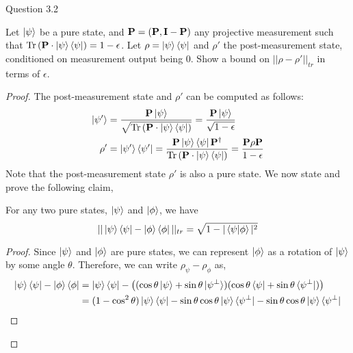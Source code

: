 \begin{solution}{Question 3.2}\label{ques:32}
    \begin{question}
        Let $\ket{\psi}$ be a pure state, and $\mathbf{P} = (\mathbf{P}, \mathbf{I} - \mathbf{P})$ any projective measurement such that $\mathrm{Tr}\left( \mathbf{P}\cdot\ket{\psi}\bra{\psi} \right) = 1 - \epsilon$. Let $\rho = \ket{\psi}\bra{\psi}$ and $\rho'$ the post-measurement state, conditioned on measurement output being $0$. Show a bound on $||\rho - \rho'||_{tr}$ in terms of $\epsilon$.
    \end{question}
    \tcblower{}
    \begin{proof}
        The post-measurement state and $\rho'$ can be computed as follows:
        \begin{equation}
            \begin{split}
                \ket{\psi'} &= \frac{\mathbf{P}\ket{\psi}}{\sqrt{\mathrm{Tr}\left( \mathbf{P}\cdot\ket{\psi}\bra{\psi} \right)}} = \frac{\mathbf{P}\ket{\psi}}{\sqrt{1-\epsilon}}\\
                \rho' &= \ket{\psi'}\bra{\psi'} = \frac{\mathbf{P}\ket{\psi}\bra{\psi}\mathbf{P}^\dagger}{\mathrm{Tr}\left( \mathbf{P}\cdot\ket{\psi}\bra{\psi} \right)} = \frac{\mathbf{P}\rho\mathbf{P}}{1-\epsilon}
            \end{split}
        \end{equation}
        Note that the post-measurement state $\rho'$ is also a pure state. We now state and prove the following claim,
        \begin{claim}
            For any two pure states, $\ket{\psi}$ and $\ket{\phi}$, we have
            \begin{equation}
                ||\ket{\psi}\bra{\psi} - \ket{\phi}\bra{\phi}||_{tr} = \sqrt{1 - |\braket{\psi|\phi}|^2}
            \end{equation}
        \end{claim}
        \begin{proof}
            Since $\ket{\psi}$ and $\ket{\phi}$ are pure states, we can represent $\ket{\phi}$ as a rotation of $\ket{\psi}$ by some angle $\theta$. Therefore, we can write $\rho_{\psi} - \rho_{\phi}$ as,
            \begin{equation}
                \begin{split}
                    \ketbra{\psi} - \ketbra{\phi} &= \ketbra{\psi} - \left((\cos\theta\ket{\psi} + \sin\theta\ket{\psi^\perp})(\cos\theta\bra{\psi} + \sin\theta\bra{\psi^\perp})\right)\\
                    &= (1-\cos^2\theta)\ketbra{\psi} - \sin\theta\cos\theta\ketbraa{\psi}{\psi^\perp} - \sin\theta\cos\theta\ketbraa{\psi}{\psi^\perp}\\

\end{split}
\end{equation}
\end{proof}
\end{proof}
\end{solution}
